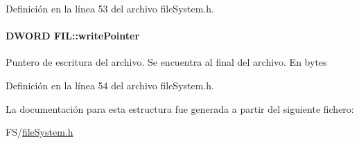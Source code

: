 Definición en la línea 53 del archivo file\+System.\+h.

\hypertarget{structFIL_a89e92b4845c72b4f9f119b38d1142a41}{
\paragraph[{write\+Pointer}]{\setlength{\rightskip}{0pt plus 5cm}D\+W\+O\+R\+D F\+I\+L\+::write\+Pointer}}\label{structFIL_a89e92b4845c72b4f9f119b38d1142a41}
Puntero de escritura del archivo. Se encuentra al final del archivo. En bytes 

Definición en la línea 54 del archivo file\+System.\+h.



La documentación para esta estructura fue generada a partir del siguiente fichero\+:\begin{DoxyCompactItemize}
\item 
F\+S/\hyperlink{fileSystem_8h}{file\+System.\+h}\end{DoxyCompactItemize}
